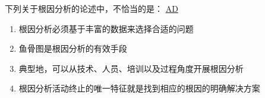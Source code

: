 \begin{problem}
	下列关于根因分析的论述中，不恰当的是： 
	\uline{AD}    
        \begin{enumerate}[label=\Alph*.]
            \item 根因分析必须基于丰富的数据来选择合适的问题
            \item 鱼骨图是根因分析的有效手段
            \item 典型地，可以从技术、人员、培训以及过程角度开展根因分析
            \item 根因分析活动终止的唯一特征就是找到相应的根因的明确解决方案
        \end{enumerate}
\end{problem}

